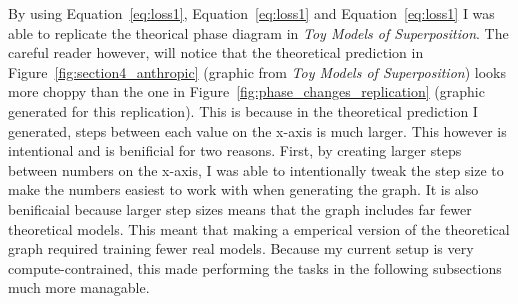 \documentclass{article} %
\begin{document}
By using Equation~\ref{eq:loss1}, Equation~\ref{eq:loss1} and Equation~\ref{eq:loss1}
I was able to replicate the theorical phase diagram in
\textit{Toy Models of Superposition}.
The careful reader however, will notice that the theoretical prediction in
Figure~\ref{fig:section4_anthropic} (graphic from \textit{Toy Models of 
Superposition}) looks more choppy than the one in Figure~\ref{fig:phase_changes_replication} (graphic
generated for this replication). This is because in the theoretical prediction I 
generated, steps between each value on the x-axis is much larger. This however is
intentional and is benificial for two reasons. First, by creating larger steps 
between numbers on
the x-axis, I was able to intentionally tweak the step size to make the numbers
easiest to work with when generating the graph. It is also benificaial because
larger step sizes means that the graph includes far fewer theoretical
models. This meant that making a emperical version of the theoretical graph 
required training fewer real models. Because my current setup is very 
compute-contrained, this made performing the tasks in the following subsections
much more managable. 



\end{document}
